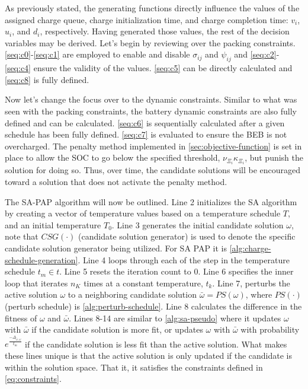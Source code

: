 \documentclass[11pt,a4paper,final]{article}
\newcommand{\Tau}{T}                        %
\begin{document}
As previously stated, the generating functions directly influence the values of the assigned charge queue, charge
initialization time, and charge completion time: \(v_i\), \(u_i\), and \(d_i\), respectively. Having generated those values,
the rest of the decision variables may be derived. Let's begin by reviewing over the packing constraints.
\ref{seq:c0}-\ref{seq:c1} are employed to enable and disable \(\sigma_{ij}\) and \(\psi_{ij}\) and \ref{seq:c2}-\ref{seq:c4} ensure
the validity of the values. \ref{seq:c5} can be directly calculated and \ref{seq:c8} is fully defined.

Now let's change the focus over to the dynamic constraints. Similar to what was seen with the packing constraints, the
battery dynamic constraints are also fully defined and can be calculated. \ref{seq:c6} is sequentially calculated after
a given schedule has been fully defined. \ref{seq:c7} is evaluated to ensure the BEB is not overcharged. The penalty
method implemented in \ref{sec:objective-function} is set in place to allow the SOC to go below the specified threshold,
\(\nu_{\Xi_i} \kappa_{\Xi_i}\), but punish the solution for doing so. Thus, over time, the candidate solutions will be encouraged
toward a solution that does not activate the penalty method.

The SA-PAP algorithm will now be outlined. Line 2 initializes the SA algorithm by creating a vector of temperature
values based on a temperature schedule \(\Tau\), and an initial temperature \(\Tau_0\). Line 3 generates the initial
candidate solution \(\omega\), note that \(CSG(\cdot)\) (candidate solution generator) is used to denote the specific candidate
solution generator being utilized. For SA PAP it is \ref{alg:charge-schedule-generation}. Line 4 loops through each of
the step in the temperature schedule \(t_m \in t\). Line 5 resets the iteration count to 0. Line 6 specifies the inner loop
that iterates \(n_K\) times at a constant temperature, \(t_k\). Line 7, perturbs the active solution \(\omega\) to a neighboring
candidate solution \(\bar{\omega} = PS(\omega)\), where \(PS(\cdot)\) (perturb schedule) is \ref{alg:perturb-schedule}. Line 8 calculates
the difference in the fitness of \(\omega\) and \(\bar{\omega}\). Lines 8-14 are similar to \ref{alg:sa-pseudo} where it updates \(\omega\)
with \(\bar{\omega}\) if the candidate solution is more fit, or updates \(\omega\) with \(\bar{\omega}\) with probability
\(e^{\frac{-\Delta_{\bar{\omega},\omega}}{t_m}}\) if the candidate solution is less fit than the active solution. What makes these lines
unique is that the active solution is only updated if the candidate is within the solution space. That it, it satisfies
the constraints defined in \ref{eq:constraints}.
\end{document}
